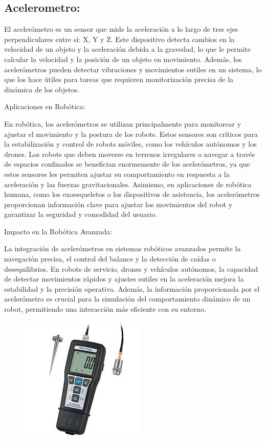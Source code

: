 \subsection{\textbf{Acelerometro}:}

El acelerómetro es un sensor que mide la aceleración a lo largo de tres ejes perpendiculares entre sí: X, Y y Z. Este dispositivo detecta cambios en la velocidad de un objeto y la aceleración debida a la gravedad, lo que le permite calcular la velocidad y la posición de un objeto en movimiento. Además, los acelerómetros pueden detectar vibraciones y movimientos sutiles en un sistema, lo que los hace útiles para tareas que requieren monitorización precisa de la dinámica de los objetos.


Aplicaciones en Robótica:


En robótica, los acelerómetros se utilizan principalmente para monitorear y ajustar el movimiento y la postura de los robots. Estos sensores son críticos para la estabilización y control de robots móviles, como los vehículos autónomos y los drones. Los robots que deben moverse en terrenos irregulares o navegar a través de espacios confinados se benefician enormemente de los acelerómetros, ya que estos sensores les permiten ajustar su comportamiento en respuesta a la aceleración y las fuerzas gravitacionales. Asimismo, en aplicaciones de robótica humana, como los exoesqueletos o los dispositivos de asistencia, los acelerómetros proporcionan información clave para ajustar los movimientos del robot y garantizar la seguridad y comodidad del usuario.


Impacto en la Robótica Avanzada:


La integración de acelerómetros en sistemas robóticos avanzados permite la navegación precisa, el control del balance y la detección de caídas o desequilibrios. En robots de servicio, drones y vehículos autónomos, la capacidad de detectar movimientos rápidos y ajustes sutiles en la aceleración mejora la estabilidad y la precisión operativa. Además, la información proporcionada por el acelerómetro es crucial para la simulación del comportamiento dinámico de un robot, permitiendo una interacción más eficiente con su entorno.
\begin{figure} [h]
	\centering
	\includegraphics[width=0.3\linewidth]{img/acelerometro}
	\caption{}
	\label{fig:acelerometro}
\end{figure}
